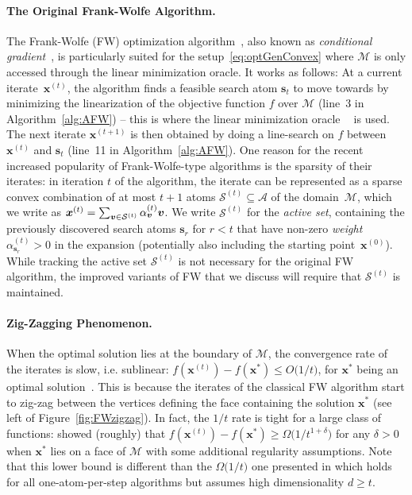 \documentclass{article} %
\newcommand{\domain}{\mathcal{M}} %
\newcommand{\x}{\bm{x}}
\newcommand{\s}{\bm{s}}
\newcommand{\vv}{\bm{v}} %
\DeclareMathOperator*{\lmo}{LMO_{\!\Vertices}}
\newcommand{\Vertices}{\mathcal{A}} %
\newcommand{\Coreset}{\mathcal{S}}
\newcommand{\0}{\mathbf{0}} %
\begin{document}
\paragraph{The Original Frank-Wolfe Algorithm.}
The Frank-Wolfe (FW) optimization algorithm~\citep{Frank:1956vp}, also known
as \emph{conditional gradient}~\citep{Levitin:1966gf}, is particularly suited
for the setup~\eqref{eq:optGenConvex} where $\domain$ is only accessed
through the linear minimization oracle.
It works as follows:
%
%
%
%
%
%
%
%
%
At a current iterate~$\x^{(t)}$, the algorithm finds a feasible search atom
$\s_t$ to move towards by minimizing the linearization of the objective
function $f$ over $\domain$ (line~3 in Algorithm~\ref{alg:AFW}) -- this is
where the linear minimization oracle $\lmo$ is used.
The next iterate $\x^{(t+1)}$ is then obtained by doing a line-search on $f$
between $\x^{(t)}$ and $\s_t$ (line~11 in Algorithm~\ref{alg:AFW}). One
reason for the recent increased popularity of Frank-Wolfe-type algorithms is
the sparsity of their iterates: in iteration $t$ of the algorithm, the
iterate can be represented as a sparse convex combination of at most $t+1$
atoms $\Coreset^{(t)}\subseteq \Vertices$ of the domain~$\domain$, which we
write as $\x^{(t)}= \sum_{\vv \in \Coreset^{(t)}} \alpha^{(t)}_{\vv} \vv\vspace{-0.3mm}$. 
%
We write $\Coreset^{(t)}$ for the \emph{active set}, containing the
previously discovered search atoms $\s_r$ for $r < t$ that have non-zero
\emph{weight} $\alpha^{(t)}_{\s_r} > 0$ in the expansion (potentially also
including the starting point~$\x^{(0)}$).
While tracking the active set $\Coreset^{(t)}$ is not necessary for the
original FW algorithm, the improved variants of FW that we discuss will require that $\Coreset^{(t)}$ is maintained.
%
%

\vspace{-2mm}
\paragraph{Zig-Zagging Phenomenon.} %
When the optimal solution lies at the boundary of $\domain$, the convergence rate of
the iterates is slow, i.e. sublinear: $f(\x^{(t)}) - f(\x^*) \le O\big(1/t\big)$, for
$\x^*$ being an optimal
solution~\citep{Frank:1956vp,Canon:1968du,Dunn:1979da,Jaggi:2013wg}. %
This is because the iterates of the classical FW algorithm start to
zig-zag between the vertices defining the face containing the
solution $\x^*$ (see left of
Figure~\ref{fig:FWzigzag}). In fact, the $1/t$ rate is tight for a large class of functions: \citet{Canon:1968du,Wolfe:1970wy}
showed (roughly) that
$f(\x^{(t)}) - f(\x^*) \geq \Omega\big(1/t^{1+\delta}\big)$ for any $\delta
>0$ when $\x^*$ lies on a face of $\domain$ with some additional regularity
assumptions.
%
Note that this lower bound is different than the $\Omega\big(1/t\big)$ one
presented in \citep[Lemma 3]{Jaggi:2013wg} which holds for all one-atom-per-step algorithms but assumes high dimensionality $d \geq t$.
%
%
%
%
%
%
%
%
\end{document}
